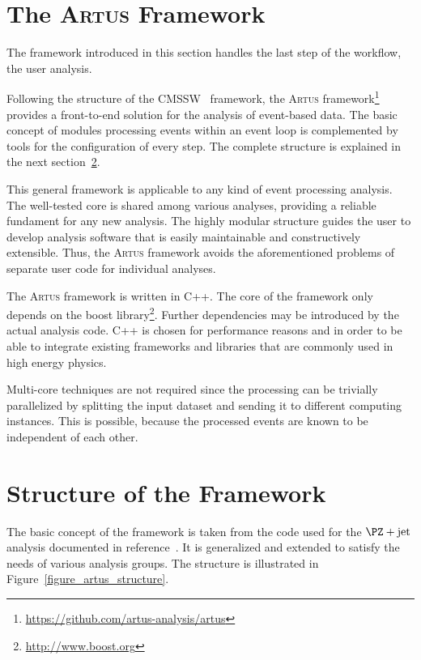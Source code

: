 \documentclass[3p]{elsarticle}
\newcommand{\software}[1]{\textsc{#1}\xspace}
\newcommand{\artus}{\software{Artus}}
\begin{document}
\section{The \artus Framework}
\label{section_artus_motivation}

The framework introduced in this section handles the last step of the workflow, the user analysis.

Following the structure of the CMSSW~\cite{cmssw} framework, the \artus framework\footnote{\url{https://github.com/artus-analysis/artus}} provides a front-to-end solution for the analysis of event-based data.
The basic concept of modules processing events within an event loop is complemented by tools for the configuration of every step.
The complete structure is explained in the next section~\ref{section_artus_structure}.

This general framework is applicable to any kind of event processing analysis.
The well-tested core is shared among various analyses, providing a reliable fundament for any new analysis.
The highly modular structure guides the user to develop analysis software that is easily maintainable and constructively extensible.
Thus, the \artus framework avoids the aforementioned problems of separate user code for individual analyses.

The \artus framework is written in C++.
The core of the framework only depends on the boost library\footnote{\url{http://www.boost.org}}.
Further dependencies may be introduced by the actual analysis code.
C++ is chosen for performance reasons and in order to be able to integrate existing frameworks and libraries that are commonly used in high energy physics.

Multi-core techniques are not required since the processing can be trivially parallelized by splitting the input dataset and sending it to different computing instances.
This is possible, because the processed events are known to be independent of each other.

\section{Structure of the Framework}
\label{section_artus_structure}

The basic concept of the framework is taken from the code used for the $\PZ+\text{jet}$ analysis documented in reference~\cite{joram_phd}.
It is generalized and extended to satisfy the needs of various analysis groups.
The structure is illustrated in Figure~\ref{figure_artus_structure}.
\end{document}
